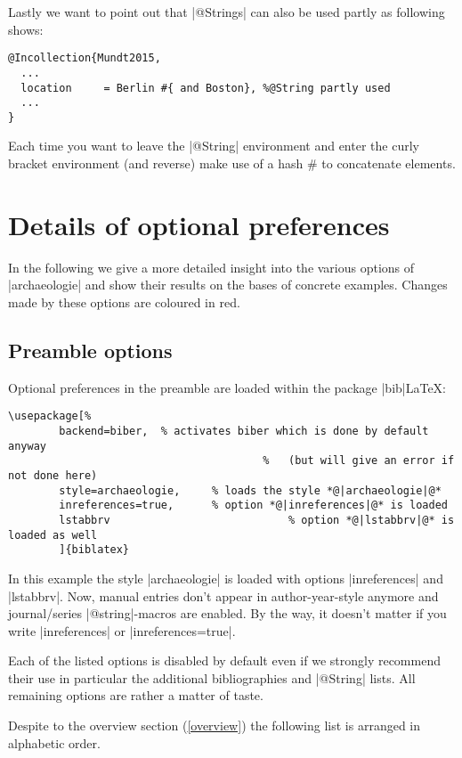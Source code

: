\documentclass[a4paper,
10pt,
greek,
french,
spanish,
italian,
ngerman,
english
]{ltxdoc}
\begin{document}
Lastly we want to point out that |@Strings| can also be used partly as following shows:

\begin{lstlisting}
@Incollection{Mundt2015,
  ...
  location     = Berlin #{ and Boston}, %@String partly used
  ...
}
\end{lstlisting}

Each time you want to leave the |@String| environment and enter the curly bracket environment (and reverse) make use of a hash \# to concatenate elements.  

\section{Details of optional preferences}\label{options-description}
In the following  we give a more detailed insight into the various options of |archaeologie| 
and show their results on the bases of concrete examples.
Changes made by these options are {\color{red}coloured in red}.

\subsection{Preamble options}\label{options-preamble}
Optional preferences in the preamble are loaded within the package |bib|\LaTeX:
\begin{lstlisting}
\usepackage[%				
		backend=biber,	% activates biber which is done by default anyway 
										%	(but will give an error if not done here)
		style=archaeologie, 	% loads the style *@|archaeologie|@*
		inreferences=true,		% option *@|inreferences|@* is loaded
		lstabbrv							% option *@|lstabbrv|@* is loaded as well
		]{biblatex}
\end{lstlisting}
In this example the style |archaeologie| is loaded with options |inreferences| and |lstabbrv|. 
Now, manual entries don't appear in author-year-style anymore and journal/series |@string|-macros are enabled.
By the way, it doesn't matter if you write |inreferences| or |inreferences=true|.

Each of the listed options is disabled by default even if we strongly recommend their use in particular the additional bibliographies and |@String| lists. 
All remaining options are rather a matter of taste.

Despite to the overview section (\cref{overview}) the following list is arranged in alphabetic order.
\end{document}
